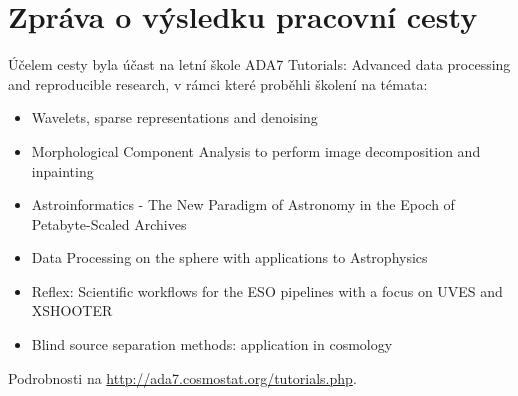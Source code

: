 \documentclass{article}
\begin{document}
\title{}
\author{Jaroslav Vážný}


\section*{Zpráva o výsledku pracovní cesty}

Účelem cesty byla účast na letní škole
ADA7 Tutorials: Advanced data processing and reproducible research,
v rámci které proběhli školení na témata:

\begin{itemize}
\item Wavelets, sparse representations and denoising
\item Morphological Component Analysis to perform image decomposition and inpainting
\item Astroinformatics - The New Paradigm of Astronomy in the Epoch of Petabyte-Scaled Archives 
\item Data Processing on the sphere with applications to Astrophysics
\item Reflex: Scientific workflows for the ESO pipelines with a focus on UVES and XSHOOTER
\item Blind source separation methods: application in cosmology 

\end{itemize}


\noindent Podrobnosti na \url{http://ada7.cosmostat.org/tutorials.php}.

\bigskip

\end{document}
